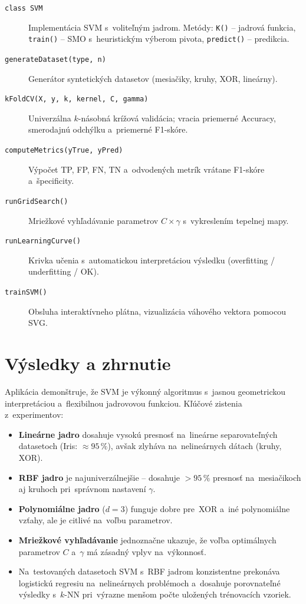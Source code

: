 \documentclass[12pt,a4paper]{article}
\begin{document}
\begin{description}
  \item[\texttt{class SVM}] Implementácia SVM s~voliteľným jadrom.
    Metódy: \texttt{K()} -- jadrová funkcia, \texttt{train()} -- SMO
    s~heuristickým výberom pivota, \texttt{predict()} -- predikcia.
  \item[\texttt{generateDataset(type, n)}] Generátor syntetických
    datasetov (mesiačiky, kruhy, XOR, lineárny).
  \item[\texttt{kFoldCV(X, y, k, kernel, C, gamma)}] Univerzálna
    $k$-násobná krížová validácia; vracia priemerné Accuracy,
    smerodajnú odchýlku a~priemerné F1-skóre.
  \item[\texttt{computeMetrics(yTrue, yPred)}] Výpočet TP, FP, FN, TN
    a~odvodených metrík vrátane F1-skóre a~špecificity.
  \item[\texttt{runGridSearch()}] Mriežkové vyhľadávanie parametrov
    $C \times \gamma$ s~vykreslením tepelnej mapy.
  \item[\texttt{runLearningCurve()}] Krivka učenia s~automatickou
    interpretáciou výsledku (overfitting / underfitting / OK).
  \item[\texttt{trainSVM()}] Obsluha interaktívneho plátna,
    vizualizácia váhového vektora pomocou SVG.
\end{description}

\section{Výsledky a zhrnutie}

Aplikácia demonštruje, že SVM je výkonný algoritmus s~jasnou geometrickou
interpretáciou a~flexibilnou jadrovovou funkciou. Kľúčové zistenia
z~experimentov:

\begin{itemize}
  \item \textbf{Lineárne jadro} dosahuje vysokú presnosť na~lineárne
    separovateľných datasetoch (Iris: $\approx 95\,\%$), avšak zlyháva
    na~nelineárnych dátach (kruhy, XOR).
  \item \textbf{RBF jadro} je najuniverzálnejšie -- dosahuje $> 95\,\%$
    presnosť na~mesiačikoch aj kruhoch pri~správnom nastavení $\gamma$.
  \item \textbf{Polynomiálne jadro} ($d = 3$) funguje dobre pre~XOR
    a~iné polynomiálne vzťahy, ale je citlivé na~voľbu parametrov.
  \item \textbf{Mriežkové vyhľadávanie} jednoznačne ukazuje, že voľba
    optimálnych parametrov $C$ a~$\gamma$ má zásadný vplyv na~výkonnosť.
  \item Na~testovaných datasetoch SVM s~RBF jadrom konzistentne
    prekonáva logistickú regresiu na~nelineárnych problémoch a~dosahuje
    porovnateľné výsledky s~$k$-NN pri~výrazne menšom počte uložených
    trénovacích vzoriek.
\end{itemize}
\end{document}
